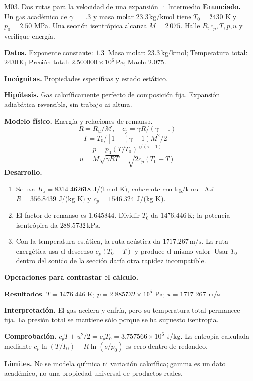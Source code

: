 \begin{studiumworked}{M03. Dos rutas para la velocidad de una expansión · Intermedio}
\textbf{Enunciado.} Un gas académico de $\gamma=1.3$ y masa molar $23.3\,\mathrm{kg/kmol}$ tiene $T_0=2430$ K y $p_0=2.50$ MPa. Una sección isentrópica alcanza $M=2.075$. Halle $R,c_p,T,p,u$ y verifique energía.

\textbf{Datos.} Exponente constante: $1.3$; Masa molar: $23.3\,\mathrm{kg/kmol}$; Temperatura total: $2430\,\mathrm{K}$; Presión total: $2.500000\times10^{6}\,\mathrm{Pa}$; Mach: $2.075$.

\textbf{Incógnitas.} Propiedades específicas y estado estático.

\textbf{Hipótesis.} Gas caloríficamente perfecto de composición fija. Expansión adiabática reversible, sin trabajo ni altura.

\textbf{Modelo físico.} Energía y relaciones de remanso.
\[R=R_u/\mathcal M,\quad c_p=\gamma R/(\gamma-1)\]
\[T=T_0/[1+(\gamma-1)M^2/2]\]
\[p=p_0(T/T_0)^{\gamma/(\gamma-1)}\]
\[u=M\sqrt{\gamma RT}=\sqrt{2c_p(T_0-T)}\]
\textbf{Desarrollo.}
\begin{enumerate}
\item Se usa $R_u=8314.462618$ J/(kmol K), coherente con kg/kmol. Así $R=356.8439$ J/(kg K) y $c_p=1546.324$ J/(kg K).
\item El factor de remanso es $1.645844$. Dividir $T_0$ da $1476.446\,\mathrm{K}$; la potencia isentrópica da $288.5732\,\mathrm{kPa}$.
\item Con la temperatura estática, la ruta acústica da $1717.267\,\mathrm{m/s}$. La ruta energética usa el descenso $c_p(T_0-T)$ y produce el mismo valor. Usar $T_0$ dentro del sonido de la sección daría otra rapidez incompatible.
\end{enumerate}
\textbf{Operaciones para contrastar el cálculo.}

\textbf{Resultados.} $T=1476.446$ K; $p=2.885732\times10^{5}$ Pa; $u=1717.267$ m/s.

\textbf{Interpretación.} El gas acelera y enfría, pero su temperatura total permanece fija. La presión total se mantiene sólo porque se ha supuesto isentropía.

\textbf{Comprobación.} $c_pT+u^2/2=c_pT_0=3.757566\times10^{6}$ J/kg. La entropía calculada mediante $c_p\ln(T/T_0)-R\ln(p/p_0)$ es cero dentro de redondeo.

\textbf{Límites.} No se modela química ni variación calorífica; gamma es un dato académico, no una propiedad universal de productos reales.
\end{studiumworked}
